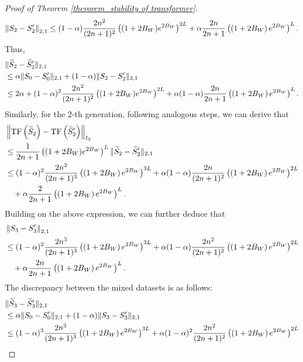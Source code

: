 \begin{proof}[Proof of Theorem \ref{therorem_stability of transformer}]
\begin{align}
    \left\|S_2-S_2^{\prime}\right\|_{2,1} \leq (1-\alpha)\frac{2n^2}{(2 n+1)^2}\left((1+2B_W) e^{2B_W}\right)^{2L}+\alpha \frac{2n}{2 n+1}\left(\left(1+2 B_W\right) e^{2 B_W}\right)^L. \notag
\end{align}
Thus,
\begin{align}
    &\|\widetilde{S}_2-\widetilde{S}_2'\|_{2,1}\notag \\
    &\leq \alpha\|S_0-S_0'\|_{2,1}+(1-\alpha) \|S_2-S_2'\|_{2,1} \notag \\
    &\leq 2\alpha+(1-\alpha)^2\frac{2n^2}{(2 n+1)^2}\left((1+2B_W) e^{2B_W}\right)^{2L}+\alpha(1-\alpha) \frac{2n}{2 n+1}\left(\left(1+2 B_W\right) e^{2 B_W}\right)^L \notag.
\end{align}
Similarly, for the 2-th generation, following analogous steps, we can derive that
\begin{align}
    &\left\|\mathrm{TF}\left(\widetilde{S}_2\right)-\mathrm{TF}\left(\widetilde{S}_2'\right)\right\|_{\ell_2} \notag\\
    &\leq \frac{1}{2 n+1}\left((1+2B_W) e^{2B_W}\right)^L \|\widetilde{S}_2-\widetilde{S}_2'\|_{2,1} \notag \\
    &\leq (1-\alpha)^2 \frac{2 n^2}{(2 n+1)^3}\left(\left(1+2 B_W\right) e^{2 B_W}\right)^{3 L}+\alpha(1-\alpha) \frac{2 n}{(2 n+1)^2}\left(\left(1+2 B_W\right) e^{2 B_W}\right)^{2L} \notag\\
    &\quad +\alpha \frac{2}{2 n+1}\left(\left(1+2 B_W\right) e^{2 B_W}\right)^L.
\end{align}
Building on the above expression, we can further deduce that
\begin{align}
    &\left\|S_3-S_3^{\prime}\right\|_{2,1}\notag \\
    &\leq (1-\alpha)^2 \frac{2 n^3}{(2 n+1)^3}\left(\left(1+2 B_W\right) e^{2 B_W}\right)^{3 L}+\alpha(1-\alpha) \frac{2 n^2}{(2 n+1)^2}\left(\left(1+2 B_W\right) e^{2 B_W}\right)^{2L} \notag\\
    &\quad +\alpha \frac{2n}{2 n+1}\left(\left(1+2 B_W\right) e^{2 B_W}\right)^L.
\end{align}
The discrepancy between the mixed datasets is as follows:
\begin{align}
    &\|\widetilde{S}_3-\widetilde{S}_3'\|_{2,1}\notag \\
    &\leq \alpha\|S_0-S_0'\|_{2,1}+(1-\alpha) \|S_3-S_3'\|_{2,1} \notag \\
     &\leq (1-\alpha)^3 \frac{2 n^3}{(2 n+1)^3}\left(\left(1+2 B_W\right) e^{2 B_W}\right)^{3 L}+\alpha(1-\alpha)^2 \frac{2 n^2}{(2 n+1)^2}\left(\left(1+2 B_W\right) e^{2 B_W}\right)^{2L} \notag\\

\end{align}
\end{proof}
